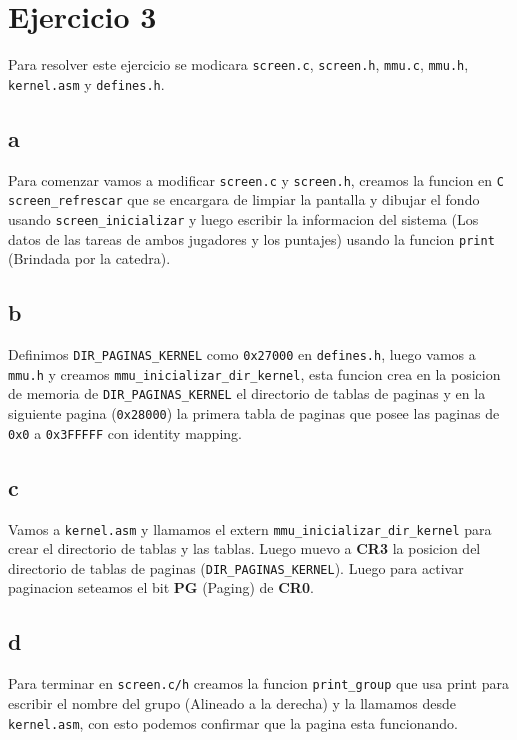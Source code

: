 \section{Ejercicio 3}

Para resolver este ejercicio se modicara \texttt{screen.c}, \texttt{screen.h}, \texttt{mmu.c}, \texttt{mmu.h}, \texttt{kernel.asm} y \texttt{defines.h}.

\subsection{a}
Para comenzar vamos a modificar \texttt{screen.c} y \texttt{screen.h}, creamos la funcion en \texttt{C} \texttt{screen\_refrescar} que se encargara de limpiar la pantalla y dibujar el fondo usando \texttt{screen\_inicializar} y luego escribir la informacion del sistema (Los datos de las tareas de ambos jugadores y los puntajes) usando la funcion \texttt{print} (Brindada por la catedra).

\subsection{b}
Definimos \texttt{DIR\_PAGINAS\_KERNEL} como \texttt{0x27000} en \texttt{defines.h}, luego vamos a \texttt{mmu.h} y creamos \texttt{mmu\_inicializar\_dir\_kernel}, esta funcion crea en la posicion de memoria de \texttt{DIR\_PAGINAS\_KERNEL} el directorio de tablas de paginas y en la siguiente pagina (\texttt{0x28000}) la primera tabla de paginas que posee las paginas de \texttt{0x0} a \texttt{0x3FFFFF} con identity mapping.

\subsection{c}
Vamos a \texttt{kernel.asm} y llamamos el extern \texttt{mmu\_inicializar\_dir\_kernel} para crear el directorio de tablas y las tablas. Luego muevo a \textbf{CR3} la posicion del directorio de tablas de paginas (\texttt{DIR\_PAGINAS\_KERNEL}). Luego para activar paginacion seteamos el bit \textbf{PG} (Paging) de \textbf{CR0}.

\subsection{d}
Para terminar en \texttt{screen.c/h} creamos la funcion \texttt{print\_group} que usa print para escribir el nombre del grupo (Alineado a la derecha) y la llamamos desde \texttt{kernel.asm}, con esto podemos confirmar que la pagina esta funcionando.